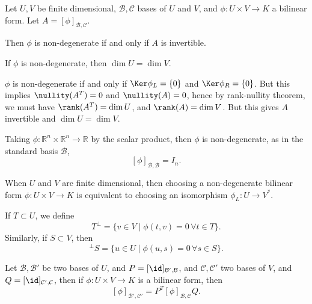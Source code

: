 \documentclass[12pt]{article}
\begin{document}
\begin{lemma}
	Let $U, V$ be finite dimensional, $\mathcal{B}, \mathcal{C}$ bases of $U$ and $V$, and $\phi: U \times V \to K$ a bilinear form. Let $A = [\phi]_{\mathcal{B}, \mathcal{C}}$.

	Then $\phi$ is non-degenerate if and only if $A$ is invertible.
\end{lemma}

\begin{corollary}
	If $\phi$ is non-degenerate, then $\dim U = \dim V$.
\end{corollary}

\begin{proofbox}
	$\phi$ is non-degenerate if and only if $\Ker \phi_L = \{0\}$ and $\Ker \phi_R = \{0\}$. But this implies $\nullity (A^{T}) = 0$ and $\nullity (A) = 0$, hence by rank-nullity theorem, we must have $\rank (A^{T}) = \dim U$, and $\rank (A) = \dim V$. But this gives $A$ invertible and $\dim U = \dim V$.
\end{proofbox}

\begin{remark}
	Taking $\phi : \mathbb{R}^{n} \times \mathbb{R}^{n} \to \mathbb{R}$ by the scalar product, then $\phi$ is non-degenerate, as in the standard basis $\mathcal{B}$,
	\[
		[\phi]_{\mathcal{B}, \mathcal{B}} = I_n
	.\]
\end{remark}

\begin{corollary}
	When $U$ and $V$ are finite dimensional, then choosing a non-degenerate bilinear form $\phi: U \times V \to K$ is equivalent to choosing an isomorphism $\phi_L : U \to V^{\ast}$.
\end{corollary}

\begin{definition}
	If $T \subset U$, we define
	\[
		T^{\perp} = \{v \in V \mid \phi(t, v) = 0 \, \forall t \in T\}
	.\]
	Similarly, if $S \subset V$, then
	\[
		^{\perp}S = \{u \in U \mid \phi(u, s) = 0 \, \forall s \in S\}
	.\]
\end{definition}

\begin{proposition}
	Let $\mathcal{B}, \mathcal{B}'$ be two bases of $U$, and $P = [\id]_{\mathcal{B}', \mathcal{B}}$, and $\mathcal{C}, \mathcal{C}'$ two bases of $V$, and $Q = [\id]_{\mathcal{C}', \mathcal{C}}$, then if $\phi: U \times V \to K$ is a bilinear form, then
	\[
		[\phi]_{\mathcal{B}', \mathcal{C}'} = P^{T} [\phi]_{\mathcal{B}, \mathcal{C}} Q
	.\]
\end{proposition}
\end{document}
